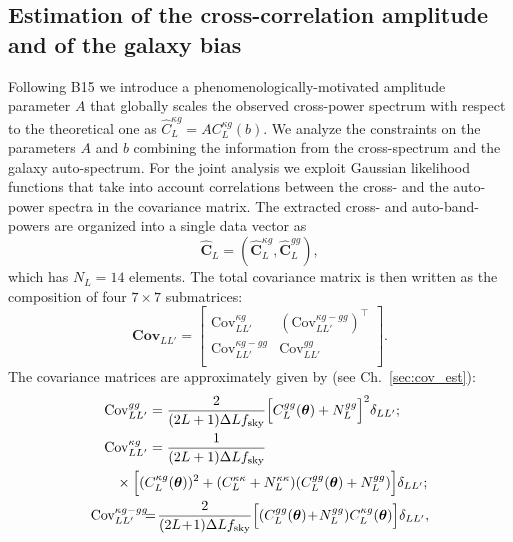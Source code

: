 \subsection{Estimation of the cross-correlation amplitude and of the galaxy bias}
\label{subsec:mcmc}

Following B15 we introduce a phenomenologically-motivated amplitude parameter $A$ that globally scales the observed cross-power spectrum
with respect to the theoretical one as $\hat{C}^{\kappa g}_{L}=AC^{\kappa g}_{L}(b)$. We analyze the constraints on the parameters $A$ and $b$ combining the information from the cross-spectrum and the galaxy auto-spectrum. For the joint analysis we exploit Gaussian likelihood functions that take into account correlations between the cross- and the auto-power spectra in the covariance matrix. The extracted cross- and auto-band-powers are organized into a single data vector as
%
\begin{equation}
\mathbf{\hat{C}}_{L} = (\mathbf{\hat{C}}^{\kappa g}_{L}, \mathbf{\hat{C}}^{gg}_{L}),
\end{equation}
%
which has $N_L=14$ elements. The total covariance matrix is then written as the composition of four $7\times7$ submatrices:
%
\begin{equation}
\textbf{Cov}_{LL'} =
\begin{bmatrix}
\text{Cov}^{\kappa g}_{LL'} & (\text{Cov}^{\kappa g-gg}_{LL'})^\intercal \\
 \text{Cov}^{\kappa g-gg}_{LL'} & \text{Cov}^{gg}_{LL'}  \\
\end{bmatrix}.
\end{equation}
%
The covariance matrices are approximately given by (see Ch.~\eqref{sec:cov_est}):
%
\begin{equation}
\label{eqn:covs}
\begin{split}
{\text{Cov}}^{gg}_{LL'} &= \frac{2}{(2L+1)\Delta L f_{\rm{sky}}}\Bigl[C_{L}^{gg}(\boldsymbol{\theta}) + N_{L}^{gg}\Bigr]^2\delta_{LL'}
; \\
{\text{Cov}}^{\kappa g}_{LL'} &= \frac{1}{(2L+1)\Delta L f_{\rm{sky}}} \\
&\!\!\!\!\!\!\!\!\!\!\!\!\!\!\times\Bigl[(C_{L}^{\kappa g}(\boldsymbol{\theta}))^2 + (C_{L}^{\kappa\kappa} + N_{L}^{\kappa\kappa})(C_{L}^{gg}(\boldsymbol{\theta}) +
N_{L}^{gg})\Bigr] \delta_{LL'} ; \\
{\text{Cov}}^{\kappa g-gg}_{LL'} &\!\!\!=\! \frac{2}{(2L\!+\!1)\Delta L f_{\rm{sky}}} \Bigl [(C^{gg}_{L}(\boldsymbol{\theta})\!+\!N^{gg}_{L})C^{\kappa
g}_{L}(\boldsymbol{\theta}) \Bigr] \delta_{LL'},
\end{split}
\end{equation}
